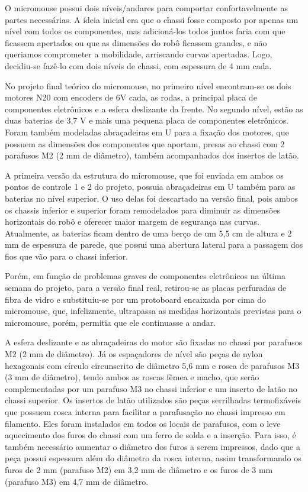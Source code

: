 O micromouse possui dois níveis/andares para comportar confortavelmente as partes necessárias. A ideia inicial era que o chassi fosse composto por apenas um nível com todos os componentes, mas adicioná-los todos juntos faria com que ficassem apertados ou que as dimensões do robô ficassem grandes, e não queriamos comprometer a mobilidade, arriscando curvas apertadas. Logo, decidiu-se fazê-lo com dois níveis de chassi, com espessura de 4 mm cada. 

No projeto final teórico do micromouse, no primeiro nível encontram-se os dois motores N20 com encoders de 6V cada, as rodas, a principal placa de componentes eletrônicos e a esfera deslizante da frente. No segundo nível, estão as duas baterias de 3,7 V e mais uma pequena placa de componentes eletrônicos. Foram também modeladas abraçadeiras em U para a fixação dos motores, que possuem as dimensões dos componentes que aportam, presas ao chassi com 2 parafusos M2 (2 mm de diâmetro), também acompanhados dos insertos de latão.

A primeira versão da estrutura do micromouse, que foi enviada em ambos os pontos de controle 1 e 2 do projeto, possuia abraçadeiras em U também para as baterias no nível superior. O uso delas foi descartado na versão final, pois ambos os chassis inferior e superior foram remodelados para diminuir as dimensões horizontais do robô e oferecer maior margem de segurança nas curvas. Atualmente, as baterias ficam dentro de uma berço de um 5,5 cm de altura e 2 mm de espessura de parede, que possui uma abertura lateral para a passagem dos fios que vão para o chassi inferior.

Porém, em função de problemas graves de componentes eletrônicos na última semana do projeto, para a versão final real, retirou-se as placas perfuradas de fibra de vidro e substituiu-se por um protoboard encaixada por cima do micromouse, que, infelizmente, ultrapassa as medidas horizontais previstas para o micromouse, porém, permitia que ele continuasse a andar.

A esfera deslizante e as abraçadeiras do motor são fixadas no chassi por parafusos M2 (2 mm de diâmetro). Já os espaçadores de nível são peças de nylon hexagonais com círculo circunscrito de diâmetro 5,6 mm e rosca de parafusos M3 (3 mm de diâmetro), tendo ambos as roscas fêmea e macho, que serão complementadas por um parafuso M3 no chassi inferior e um inserto de latão no chassi superior. Os insertos de latão utilizados são peças serrilhadas termofixáveis que possuem rosca interna para facilitar a parafusação no chassi impresso em filamento. Eles foram instalados em todos os locais de parafusos, com o leve aquecimento dos furos do chassi com um ferro de solda e a inserção. Para isso, é também necessário aumentar o diâmetro dos furos a serem impressos, dado que a peça possui espessura além do diâmetro da rosca interna, assim transformando os furos de 2 mm (parafuso M2) em 3,2 mm de diâmetro e os furos de 3 mm (parafuso M3) em 4,7 mm de diâmetro.

